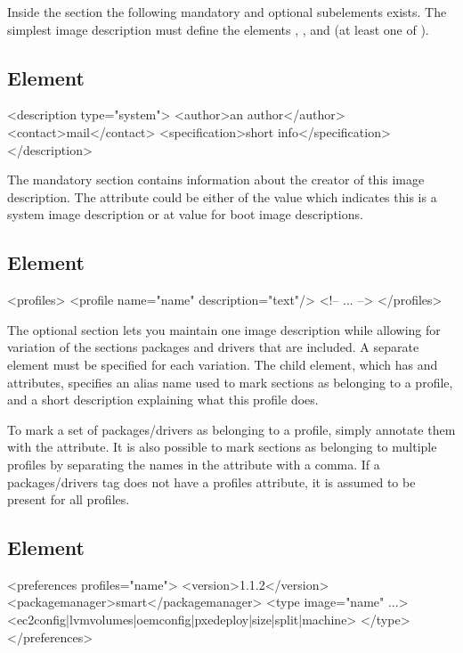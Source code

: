 Inside the  section the following mandatory and optional
subelements exists. The simplest image description must define the
elements , , 
 and  (at least one of 
).

\subsection{ Element}
\begin{xml}
<description type="system">
  <author>an author</author>
  <contact>mail</contact>
  <specification>short info</specification>
</description>
\end{xml}

The mandatory  section contains information about
the creator of this image description. The attribute 
could be either of the value  which indicates this is a
system image description or at value  for boot image
descriptions.

\subsection{ Element}
\begin{xml}
<profiles>
  <profile name="name" description="text"/>
  <!-- ... -->
</profiles>
\end{xml}

The optional  section lets you maintain one image description
while allowing for variation of the sections packages and drivers that are
included. A separate  element must be specified for each variation.
The  child element, which has  and  attributes,
specifies an alias name used to mark sections as belonging to a profile,
and a short description explaining what this profile does.

To mark a set of packages/drivers as belonging to a profile, simply
annotate them with the  attribute. It is also possible
to mark sections as belonging to multiple profiles by separating the
names in the  attribute with a comma.
If a packages/drivers tag does not have a profiles attribute, it is
assumed to be present for all profiles.

\subsection{ Element}
\begin{xml}
<preferences profiles="name">
  <version>1.1.2</version>
  <packagemanager>smart</packagemanager>
  <type image="name" ...>
    <ec2config|lvmvolumes|oemconfig|pxedeploy|size|split|machine>
  </type>
</preferences>
\end{xml}

